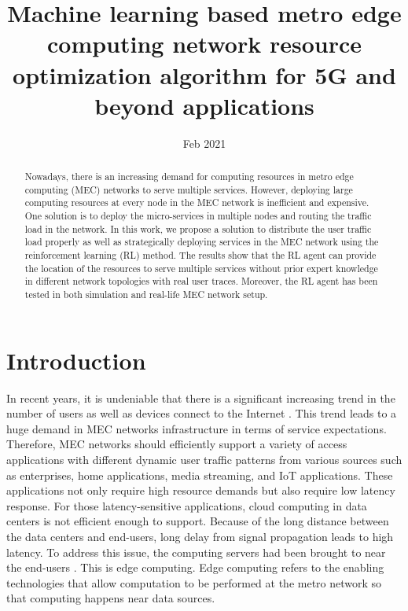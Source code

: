 \documentclass[conference]{IEEEtran}
\title{Machine learning based metro edge computing network resource optimization algorithm for 5G and beyond applications}
\author{\IEEEauthorblockN{Luong Quoc Dat}
\IEEEauthorblockA{\textit{Dept. of Electrical Engineering} \\
\textit{Technical University of Eindhoven}\\
}}
\date{Feb 2021}
\begin{document}
\maketitle

\begin{abstract}
Nowadays, there is an increasing demand for computing resources in metro edge computing (MEC) networks to serve multiple services. However, deploying large computing resources at every node in the MEC network is inefficient and expensive. One solution is to deploy the micro-services in multiple nodes and routing the traffic load in the network. In this work, we propose a solution to distribute the user traffic load properly as well as strategically deploying services in the MEC network using the reinforcement learning (RL) method. The results show that the RL agent can provide the location of the resources to serve multiple services without prior expert knowledge in different network topologies with real user traces. Moreover, the RL agent has been tested in both simulation and real-life MEC network setup. 
\end{abstract}

\section{Introduction}
\label{sec:Introduction}
In recent years, it is undeniable that there is a significant increasing trend in the number of users as well as devices connect to the Internet \cite{International2017}. This trend leads to a huge demand in MEC networks infrastructure in terms of service expectations. Therefore, MEC networks should efficiently support a variety of access applications with different dynamic user traffic patterns from various sources such as enterprises, home applications, media streaming, and IoT applications. These applications not only require high resource demands but also require low latency response. For those latency-sensitive applications, cloud computing in data centers is not efficient enough to support. Because of the long distance between the data centers and end-users, long delay from signal propagation leads to high latency. To address this issue, the computing servers had been brought to near the end-users \cite{Shi2016}. This is edge computing. Edge computing refers to the enabling technologies that allow computation to be performed at the metro network so that computing happens near data sources. 
\end{document}
